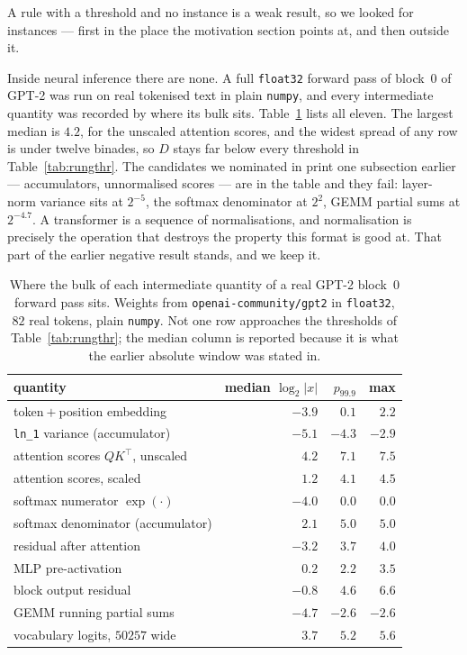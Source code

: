 \documentclass[11pt]{article}
\theoremstyle{definition}
\begin{document}
A rule with a threshold and no instance is a weak result, so we looked for
instances --- first in the place the motivation section points at, and then
outside it.

Inside neural inference there are none. A full \texttt{float32} forward pass of
block~$0$ of GPT-2 was run on real tokenised text in plain \texttt{numpy}, and
every intermediate quantity was recorded by where its bulk sits.
Table~\ref{tab:landing} lists all eleven. The largest median is $4.2$, for the
unscaled attention scores, and the widest spread of any row is under twelve
binades, so $D$ stays far below every threshold in Table~\ref{tab:rungthr}. The
candidates we nominated in print one subsection earlier --- accumulators,
unnormalised scores --- are in the table and they fail: layer-norm variance sits
at $2^{-5}$, the softmax denominator at $2^{2}$, GEMM partial sums at
$2^{-4.7}$. A transformer is a sequence of normalisations, and normalisation is
precisely the operation that destroys the property this format is good at. That
part of the earlier negative result stands, and we keep it.

\begin{table}[htbp]\centering
\caption{Where the bulk of each intermediate quantity of a real GPT-2 block~$0$
forward pass sits. Weights from \texttt{openai-community/gpt2} in \texttt{float32},
$82$ real tokens, plain \texttt{numpy}. Not one row approaches the thresholds of
Table~\ref{tab:rungthr}; the median column is reported because it is what the
earlier absolute window was stated in.}
\label{tab:landing}
\begin{tabular}{lrrr}
\hline
quantity & median $\log_2|x|$ & $p_{99.9}$ & max \\
\hline
token${}+{}$position embedding & $-3.9$ & $0.1$ & $2.2$ \\
\texttt{ln\_1} variance (accumulator) & $-5.1$ & $-4.3$ & $-2.9$ \\
attention scores $QK^{\!\top}$, unscaled & $4.2$ & $7.1$ & $7.5$ \\
attention scores, scaled & $1.2$ & $4.1$ & $4.5$ \\
softmax numerator $\exp(\cdot)$ & $-4.0$ & $0.0$ & $0.0$ \\
softmax denominator (accumulator) & $2.1$ & $5.0$ & $5.0$ \\
residual after attention & $-3.2$ & $3.7$ & $4.0$ \\
MLP pre-activation & $0.2$ & $2.2$ & $3.5$ \\
block output residual & $-0.8$ & $4.6$ & $6.6$ \\
GEMM running partial sums & $-4.7$ & $-2.6$ & $-2.6$ \\
vocabulary logits, $50257$ wide & $3.7$ & $5.2$ & $5.6$ \\
\hline
\end{tabular}
\end{table}
\end{document}
